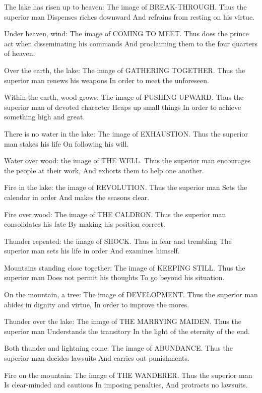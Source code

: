{The lake has risen up to heaven:
 The image of BREAK-THROUGH.
 Thus the superior man
 Dispenses riches downward
 And refrains from resting on his virtue.}

{Under heaven, wind:
 The image of COMING TO MEET.
 Thus does the prince act when disseminating his commands
 And proclaiming them to the four quarters of heaven.}

{Over the earth, the lake:
 The image of GATHERING TOGETHER.
 Thus the superior man renews his weapons
 In order to meet the unforeseen.}

{Within the earth, wood grows:
 The image of PUSHING UPWARD.
 Thus the superior man of devoted character
 Heaps up small things
 In order to achieve something high and great.}

{There is no water in the lake:
 The image of EXHAUSTION.
 Thus the superior man stakes his life
 On following his will.}

{Water over wood: the image of THE WELL.
 Thus the superior man encourages the people at their work,
 And exhorts them to help one another.}

{Fire in the lake: the image of
 REVOLUTION.
 Thus the superior man
 Sets the calendar in order
 And makes the seasons clear.}

{Fire over wood:
 The image of THE CALDRON.
 Thus the superior man consolidates his fate
 By making his position correct.}

{Thunder repeated: the image of SHOCK.
 Thus in fear and trembling
 The superior man sets his life in order
 And examines himself.}

{Mountains standing close together:
 The image of KEEPING STILL.
 Thus the superior man
 Does not permit his thoughts
 To go beyond his situation.}

{On the mountain, a tree:
 The image of DEVELOPMENT.
 Thus the superior man abides in dignity and virtue,
 In order to improve the mores.}

{Thunder over the lake:
 The image of THE MARRYING MAIDEN.
 Thus the superior man
 Understands the transitory
 In the light of the eternity of the end.}

{Both thunder and lightning come:
 The image of ABUNDANCE.
 Thus the superior man decides lawsuits
 And carries out punishments.}

{Fire on the mountain:
 The image of THE WANDERER.
 Thus the superior man
 Is clear-minded and cautious
 In imposing penalties,
 And protracts no lawsuits.}

